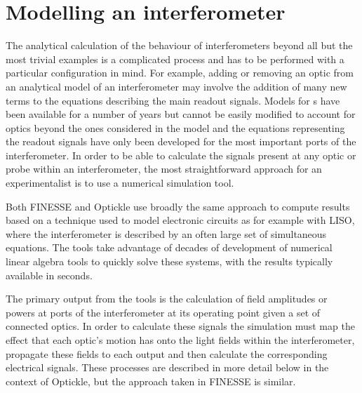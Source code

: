 \section{\label{sec:ifo-modelling}Modelling an interferometer}
The analytical calculation of the behaviour of interferometers beyond all but the most trivial examples is a complicated process and has to be performed with a particular configuration in mind. For example, adding or removing an optic from an analytical model of an interferometer may involve the addition of many new terms to the equations describing the main readout signals. Models for \DRFPMI{}s have been available for a number of years \cite{Strain2003, Mueller2003, Mason2003} but cannot be easily modified to account for optics beyond the ones considered in the model and the equations representing the readout signals have only been developed for the most important ports of the interferometer. In order to be able to calculate the signals present at any optic or probe within an interferometer, the most straightforward approach for an experimentalist is to use a numerical simulation tool.

Both \gls{FINESSE} and Optickle use broadly the same approach to compute results based on a technique used to model electronic circuits as for example with \gls{LISO}, where the interferometer is described by an often large set of simultaneous equations. The tools take advantage of decades of development of numerical linear algebra tools to quickly solve these systems, with the results typically available in seconds.

The primary output from the tools is the calculation of field amplitudes or powers at ports of the interferometer at its operating point given a set of connected optics. In order to calculate these signals the simulation must map the effect that each optic's motion has onto the light fields within the interferometer, propagate these fields to each output and then calculate the corresponding electrical signals. These processes are described in more detail below in the context of Optickle, but the approach taken in \gls{FINESSE} is similar.

